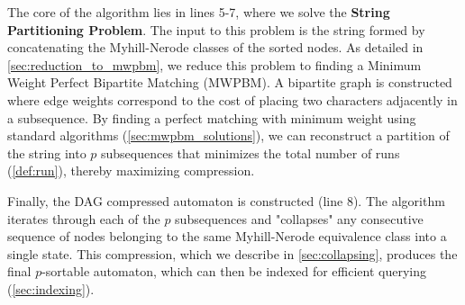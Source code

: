The core of the algorithm lies in lines 5-7, where we solve the \textbf{String Partitioning Problem}. The input to this problem is the string formed by concatenating the Myhill-Nerode classes of the sorted nodes. As detailed in \cref{sec:reduction_to_mwpbm}, we reduce this problem to finding a Minimum Weight Perfect Bipartite Matching (MWPBM). A bipartite graph is constructed where edge weights correspond to the cost of placing two characters adjacently in a subsequence. By finding a perfect matching with minimum weight using standard algorithms (\cref{sec:mwpbm_solutions}), we can reconstruct a partition of the string into $p$ subsequences that minimizes the total number of runs (\cref{def:run}), thereby maximizing compression.

Finally, the DAG compressed automaton is constructed (line 8). The algorithm iterates through each of the $p$ subsequences and "collapses" any consecutive sequence of nodes belonging to the same Myhill-Nerode equivalence class into a single state. This compression, which we describe in \cref{sec:collapsing}, produces the final $p$-sortable automaton, which can then be indexed for efficient querying (\cref{sec:indexing}).

